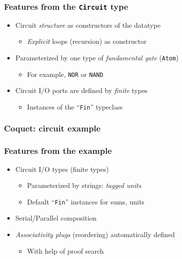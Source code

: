         \begin{frame}
            \frametitle{Features from the \texttt{Circuit} type}

            \begin{itemize}
                \item Circuit \emph{structure} as constructors of the datatype
                    \begin{itemize}
                        \item \emph{Explicit} loops (recursion) as constructor
                    \end{itemize}
                \item Parameterized by one type of \emph{fundamental gate} (\texttt{Atom})
                    \begin{itemize}
                        \item For example, \texttt{NOR} or \texttt{NAND}
                    \end{itemize}
                \item Circuit I/O ports are defined by \emph{finite} types
                    \begin{itemize}
                        \item Instances of the ``\texttt{Fin}'' typeclass
                    \end{itemize}
            \end{itemize}
        \end{frame}

        \begin{frame}
            \frametitle{Coquet: circuit example}
        \end{frame}

        \begin{frame}
            \frametitle{Features from the example}
            
            \begin{itemize}
                \item Circuit I/O types (finite types)
                    \begin{itemize}
                        \item Parameterized by strings: \emph{tagged units}
                        \item Default ``\texttt{Fin}'' instances for sums, units
                    \end{itemize}
                \item Serial/Parallel composition
                \item \emph{Associativity plugs} (reordering) automatically defined
                    \begin{itemize}
                        \item With help of proof search
                    \end{itemize}
            \end{itemize}
        \end{frame}

